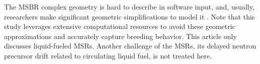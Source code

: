The \gls{MSBR} complex geometry is hard to describe in software input, and, 
usually, researchers make significant geometric simplifications to model it 
\cite{park_whole_2015}. Note that this study leverages extensive computational 
resources to avoid these geometric approximations and accurately capture 
breeding behavior. This article only discusses liquid-fueled \glspl{MSR}. 
Another challenge of the \glspl{MSR}, its delayed neutron precursor drift 
related to circulating liquid fuel, is not treated here.
